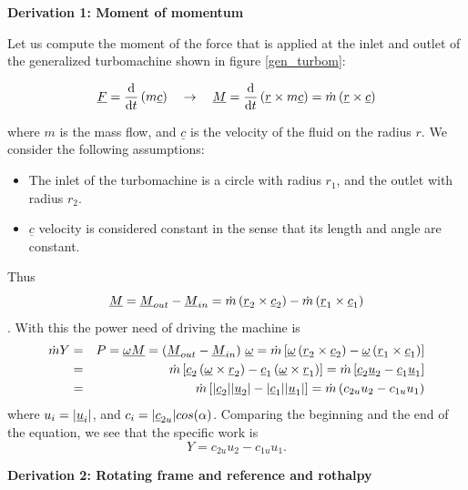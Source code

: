 {\bf Derivation 1: Moment of momentum}

Let us compute the moment of the force that is applied at the inlet and outlet of the generalized turbomachine shown in figure \ref{gen_turbom}:

\begin{equation}
\underline{F}=\frac{\mathrm{d}}{\mathrm{d} t}\left( m \underline{c}\right)
\quad \rightarrow\quad
\underline{M}=\frac{\mathrm{d}}{\mathrm{d} t}\left( \underline{r} \times m \underline{c}\right)=\dot{m}\left( \underline{r} \times \underline{c}\right)
\end{equation}

where $m$ is the mass flow, and $\underline{c}$ is the velocity of the fluid on the radius $r$. We consider the following assumptions:
\begin{itemize}
  \item The inlet of the turbomachine is a circle with radius $r_1$, and the outlet with radius $r_2$.
  \item $\underline{c}$ velocity is considered constant in the sense that its length and angle are constant.
\end{itemize}
Thus $$ \underline{M} = \underline{M}_{out}-\underline{M}_{in}=\dot{m}\left( \underline{r}_2 \times \underline{c}_2\right) - \dot{m}\left( \underline{r}_1 \times \underline{c}_1\right) $$.
With this the power need of driving the machine is
%
\begin{eqnarray}
	\dot m Y &= & P = \underline{\omega} \underline{M} = \left(\underline{M}_{out}-\underline{M}_{in}\right)\, \underline{\omega}
	=\dot m \left[ \underline{\omega} \left( \underline{r}_2 \times \underline{c}_2\right) - \underline{\omega} \left( \underline{r}_1 \times \underline{c}_1\right) \right] \nonumber\\
	&=&\dot m \left[ \underline{c}_2 \left( \underline{\omega} \times \underline{r}_2 \right) - \underline{c}_1 \left( \underline{\omega} \times \underline{r}_1 \right) \right]
	=\dot m \left[ \underline{c}_2 \underline{u}_2 - \underline{c}_1 \underline{u}_1 \right] \nonumber\\
	&=&\dot m \left[ |\underline{c}_2| |\underline{u}_2| - |\underline{c}_1| |\underline{u}_1| \right]
	=\dot m \left( c_{2u} u_2 - c_{1u} u_1\right)
\end{eqnarray}
%
where $u_i = |\underline{u}_i|$, and $c_i=|\underline{c}_{2u}| cos(\alpha)$.
Comparing the beginning and the end of the equation, we see that the specific work is
\begin{equation}
\boxed{Y=c_{2u} u_2 - c_{1u} u_1}.
\end{equation}

{\bf Derivation 2: Rotating frame and reference and rothalpy}

